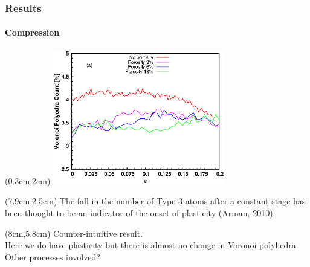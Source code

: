 \begin{frame}
    \frametitle{Results}
    \framesubtitle{Compression}
    \begin{textblock*}{7.5cm}(0.3cm,2cm) %
        \includegraphics[width=7.5cm]{Presentacion_PANACM_Franco/tipe3_strain_comp.eps}
    \end{textblock*}
    \begin{textblock*}{5cm}(7.9cm,2.5cm) %
        The fall in the number of Type 3 atoms after a constant stage has been thought to be an indicator of the onset of plasticity (Arman, 2010).
    \end{textblock*}
    \begin{textblock*}{5cm}(8cm,5.8cm) %
        Counter-intuitive result.\\
        Here we do have plasticity but there is almost no change in Voronoi polyhedra.\\
        Other processes involved?
    \end{textblock*}
\end{frame}


